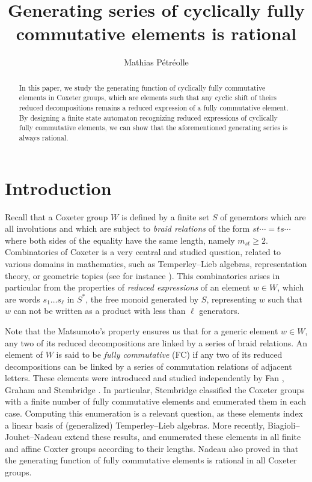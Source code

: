 \documentclass[reqno,12pt]{amsart}
\title[Generating series of cyclically fully commutative elements]{Generating series of cyclically fully commutative elements is rational}
\author[Mathias P\'etr\'eolle]{Mathias P\'etr\'eolle}
\theoremstyle{definition}
\begin{document}
\maketitle

\begin{abstract}
In this paper,  we study the generating function of cyclically fully commutative elements in Coxeter groups, which are elements such that any cyclic shift of theirs reduced decompositions remains a reduced expression of a fully commutative element. By designing a finite state automaton recognizing reduced expressions of cyclically fully commutative elements, we can show that the aforementioned generating series is always rational.


\end{abstract}

\section{Introduction}

Recall that a Coxeter group $W$ is defined by a finite set $S$ of generators which are all involutions and which are subject to \emph{braid relations} of the form $st\cdots=ts\cdots$ where both sides of the equality have the same length, namely $m_{st} \geq 2$. Combinatorics of Coxeter is a very central and studied question, related to various domains in mathematics, such as Temperley--Lieb algebras, representation theory, or geometric topics (see for instance \cite{BB, HUM}).  This combinatorics arises in particular from the properties of \emph{reduced expressions} of an element $w \in W$, which are words $s_1 \ldots s_\ell$ in $S^*$, the free monoid generated by $S$, representing $w$ such that $w$ can not be written as a product with less than $\ell$ generators. 

 Note that the Matsumoto's property ensures us that for a generic element $w \in W$, any two of its reduced decompositions are linked by a series of braid relations. An element of $W$ is said to be \emph{fully commutative} (FC) if any two of its reduced decompositions can be linked by a series of commutation relations of adjacent letters. These elements were introduced and studied independently by Fan \cite{FAN}, Graham \cite{GRA} and Stembridge \cite{STEM1, STEM2, STEM3}. In particular, Stembridge classified the Coxeter groups with a finite number of fully commutative elements and enumerated them in each case. Computing this enumeration is a relevant question, as these elements index a linear basis of (generalized) Temperley--Lieb algebras. More recently, Biagioli--Jouhet--Nadeau \cite{BJN2} extend these results, and enumerated these elements in all finite and affine Coxter groups according to their lengths. Nadeau also proved in \cite{NAD} that the generating function of fully commutative elements is rational in all Coxeter groups.
 
\end{document}
